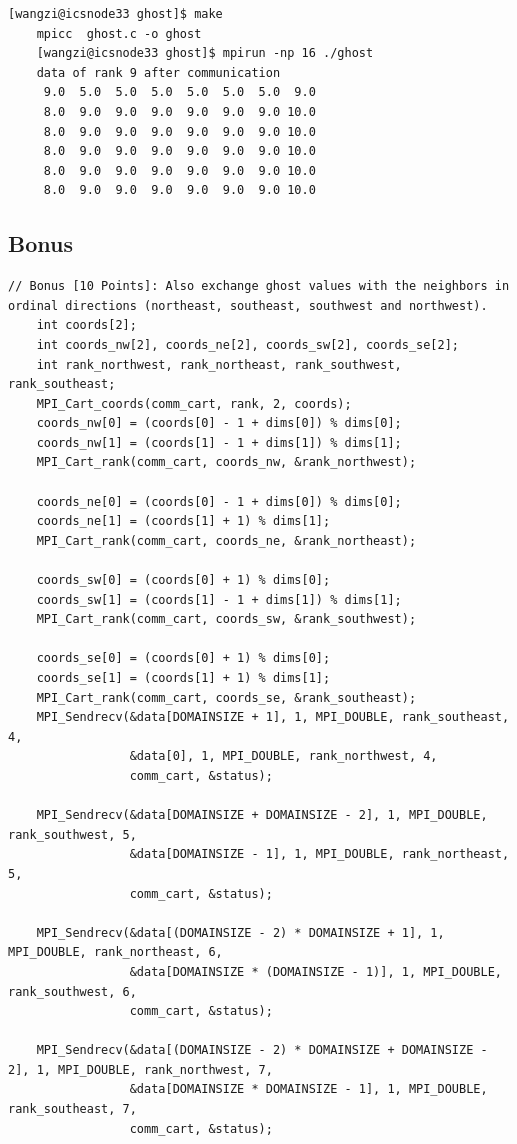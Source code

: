 \documentclass[unicode,11pt,a4paper,oneside,numbers=endperiod,openany]{scrartcl}
\begin{document}
\begin{lstlisting}[style=mystyle, language=MyBash, caption={Compilation and Execution of Ghost Communication}]
    [wangzi@icsnode33 ghost]$ make
    mpicc  ghost.c -o ghost
    [wangzi@icsnode33 ghost]$ mpirun -np 16 ./ghost
    data of rank 9 after communication
     9.0  5.0  5.0  5.0  5.0  5.0  5.0  9.0
     8.0  9.0  9.0  9.0  9.0  9.0  9.0 10.0
     8.0  9.0  9.0  9.0  9.0  9.0  9.0 10.0
     8.0  9.0  9.0  9.0  9.0  9.0  9.0 10.0
     8.0  9.0  9.0  9.0  9.0  9.0  9.0 10.0
     8.0  9.0  9.0  9.0  9.0  9.0  9.0 10.0
\end{lstlisting}
    
\subsection{Bonus}

\begin{lstlisting}[style=mystyle, language=MyC++, caption={Exchanging Ghost Values with Ordinal Neighbors}]
    // Bonus [10 Points]: Also exchange ghost values with the neighbors in ordinal directions (northeast, southeast, southwest and northwest).
    int coords[2]; 
    int coords_nw[2], coords_ne[2], coords_sw[2], coords_se[2];
    int rank_northwest, rank_northeast, rank_southwest, rank_southeast; 
    MPI_Cart_coords(comm_cart, rank, 2, coords);
    coords_nw[0] = (coords[0] - 1 + dims[0]) % dims[0];
    coords_nw[1] = (coords[1] - 1 + dims[1]) % dims[1];
    MPI_Cart_rank(comm_cart, coords_nw, &rank_northwest);

    coords_ne[0] = (coords[0] - 1 + dims[0]) % dims[0];
    coords_ne[1] = (coords[1] + 1) % dims[1];
    MPI_Cart_rank(comm_cart, coords_ne, &rank_northeast);

    coords_sw[0] = (coords[0] + 1) % dims[0];
    coords_sw[1] = (coords[1] - 1 + dims[1]) % dims[1];
    MPI_Cart_rank(comm_cart, coords_sw, &rank_southwest);

    coords_se[0] = (coords[0] + 1) % dims[0];
    coords_se[1] = (coords[1] + 1) % dims[1];
    MPI_Cart_rank(comm_cart, coords_se, &rank_southeast);
    MPI_Sendrecv(&data[DOMAINSIZE + 1], 1, MPI_DOUBLE, rank_southeast, 4,
                 &data[0], 1, MPI_DOUBLE, rank_northwest, 4,
                 comm_cart, &status);

    MPI_Sendrecv(&data[DOMAINSIZE + DOMAINSIZE - 2], 1, MPI_DOUBLE, rank_southwest, 5,
                 &data[DOMAINSIZE - 1], 1, MPI_DOUBLE, rank_northeast, 5,
                 comm_cart, &status);

    MPI_Sendrecv(&data[(DOMAINSIZE - 2) * DOMAINSIZE + 1], 1, MPI_DOUBLE, rank_northeast, 6,
                 &data[DOMAINSIZE * (DOMAINSIZE - 1)], 1, MPI_DOUBLE, rank_southwest, 6,
                 comm_cart, &status);

    MPI_Sendrecv(&data[(DOMAINSIZE - 2) * DOMAINSIZE + DOMAINSIZE - 2], 1, MPI_DOUBLE, rank_northwest, 7,
                 &data[DOMAINSIZE * DOMAINSIZE - 1], 1, MPI_DOUBLE, rank_southeast, 7,
                 comm_cart, &status);
\end{lstlisting}
\end{document}
